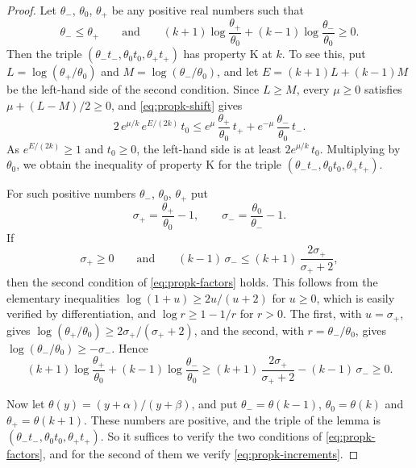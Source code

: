 \documentclass{amsart}
\theoremstyle{definition}
\theoremstyle{remark}
\numberwithin{equation}{section}
\begin{document}
\begin{proof}
Let $\theta_-$, $\theta_0$, $\theta_+$ be any positive real numbers such
that
\begin{equation}\label{eq:propk-factors}
\theta_-\le\theta_+\qquad\text{and}\qquad
(k+1)\log\frac{\theta_+}{\theta_0}+(k-1)\log\frac{\theta_-}{\theta_0}\ge0 .
\end{equation}
Then the triple $(\theta_-t_-,\theta_0t_0,\theta_+t_+)$ has property K at
$k$. To see this, put $L=\log(\theta_+/\theta_0)$ and
$M=\log(\theta_-/\theta_0)$, and let $E=(k+1)L+(k-1)M$ be the left-hand
side of the second condition.
Since $L\ge M$, every $\mu\ge0$ satisfies $\mu+(L-M)/2\ge0$, and
\eqref{eq:propk-shift} gives
\[
2\,e^{\mu/k}\,e^{E/(2k)}\,t_0\le e^{\mu}\,\frac{\theta_+}{\theta_0}\,t_+
+e^{-\mu}\,\frac{\theta_-}{\theta_0}\,t_- .
\]
As $e^{E/(2k)}\ge1$ and $t_0\ge0$, the left-hand side is at least
$2e^{\mu/k}\,t_0$. Multiplying by $\theta_0$, we obtain the inequality of
property K for the triple $(\theta_-t_-,\theta_0t_0,\theta_+t_+)$.

For such positive numbers $\theta_-$, $\theta_0$, $\theta_+$ put
\[
\sigma_+=\frac{\theta_+}{\theta_0}-1,\qquad
\sigma_-=\frac{\theta_0}{\theta_-}-1 .
\]
If
\begin{equation}\label{eq:propk-increments}
\sigma_+\ge0\qquad\text{and}\qquad
(k-1)\,\sigma_-\le(k+1)\,\frac{2\sigma_+}{\sigma_++2},
\end{equation}
then the second condition of \eqref{eq:propk-factors} holds. This follows
from the elementary inequalities $\log(1+u)\ge2u/(u+2)$ for $u\ge0$, which
is easily verified by differentiation, and $\log r\ge1-1/r$ for $r>0$. The
first, with $u=\sigma_+$, gives
$\log(\theta_+/\theta_0)\ge2\sigma_+/(\sigma_++2)$, and the second, with
$r=\theta_-/\theta_0$, gives $\log(\theta_-/\theta_0)\ge-\sigma_-$. Hence
\[
(k+1)\log\frac{\theta_+}{\theta_0}+(k-1)\log\frac{\theta_-}{\theta_0}
\ge(k+1)\,\frac{2\sigma_+}{\sigma_++2}-(k-1)\,\sigma_-\ge0 .
\]

Now let $\theta(y)=(y+\alpha)/(y+\beta)$, and put $\theta_-=\theta(k-1)$,
$\theta_0=\theta(k)$ and $\theta_+=\theta(k+1)$. These numbers are positive,
and the triple of the lemma is $(\theta_-t_-,\theta_0t_0,\theta_+t_+)$. So
it suffices to verify the two conditions of \eqref{eq:propk-factors}, and
for the second of them we verify \eqref{eq:propk-increments}.


\end{proof}
\end{document}
